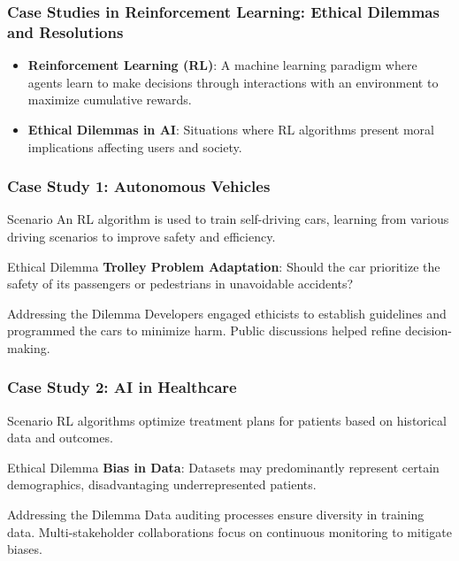 \documentclass[aspectratio=169]{beamer}
\begin{document}
\begin{frame}[fragile]
    \frametitle{Case Studies in Reinforcement Learning: Ethical Dilemmas and Resolutions}
    \begin{itemize}
        \item \textbf{Reinforcement Learning (RL)}: A machine learning paradigm where agents learn to make decisions through interactions with an environment to maximize cumulative rewards.
        \item \textbf{Ethical Dilemmas in AI}: Situations where RL algorithms present moral implications affecting users and society.
    \end{itemize}
\end{frame}

\begin{frame}[fragile]
    \frametitle{Case Study 1: Autonomous Vehicles}
    
    \begin{block}{Scenario}
        An RL algorithm is used to train self-driving cars, learning from various driving scenarios to improve safety and efficiency.
    \end{block}
    
    \begin{block}{Ethical Dilemma}
        \textbf{Trolley Problem Adaptation}: Should the car prioritize the safety of its passengers or pedestrians in unavoidable accidents?
    \end{block}

    \begin{block}{Addressing the Dilemma}
        Developers engaged ethicists to establish guidelines and programmed the cars to minimize harm. Public discussions helped refine decision-making.
    \end{block}
\end{frame}

\begin{frame}[fragile]
    \frametitle{Case Study 2: AI in Healthcare}
    
    \begin{block}{Scenario}
        RL algorithms optimize treatment plans for patients based on historical data and outcomes.
    \end{block}
    
    \begin{block}{Ethical Dilemma}
        \textbf{Bias in Data}: Datasets may predominantly represent certain demographics, disadvantaging underrepresented patients.
    \end{block}

    \begin{block}{Addressing the Dilemma}
        Data auditing processes ensure diversity in training data. Multi-stakeholder collaborations focus on continuous monitoring to mitigate biases.
    \end{block}
\end{frame}
\end{document}
